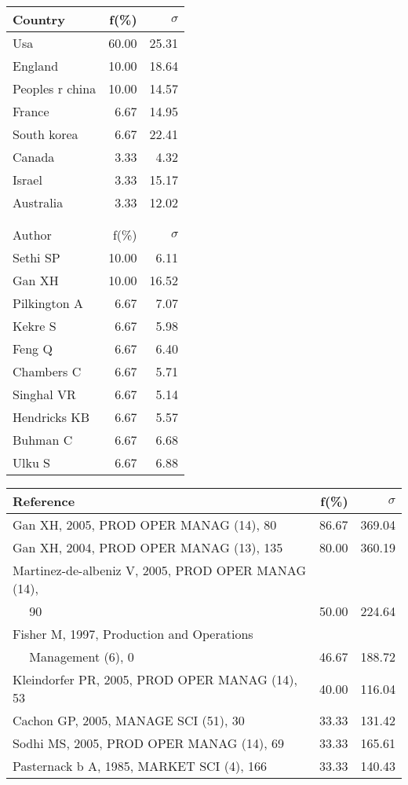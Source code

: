 \documentclass[a4paper,11pt]{report}
\begin{document}
\begin{landscape}
\begin{table}[!ht]
{\begin{tabular}{|l r r|}
\hline
\hline
Country & f(\%) & $\sigma$\\
\hline
Usa & 60.00 & 25.31\\
England & 10.00 & 18.64\\
Peoples r china & 10.00 & 14.57\\
France & 6.67 & 14.95\\
South korea & 6.67 & 22.41\\
Canada & 3.33 & 4.32\\
Israel & 3.33 & 15.17\\
Australia & 3.33 & 12.02\\
 &  & \\
 &  & \\
\hline
\hline
Author & f(\%) & $\sigma$\\
\hline
Sethi SP & 10.00 & 6.11\\
Gan XH & 10.00 & 16.52\\
Pilkington A & 6.67 & 7.07\\
Kekre S & 6.67 & 5.98\\
Feng Q & 6.67 & 6.40\\
Chambers C & 6.67 & 5.71\\
Singhal VR & 6.67 & 5.14\\
Hendricks KB & 6.67 & 5.57\\
Buhman C & 6.67 & 6.68\\
Ulku S & 6.67 & 6.88\\
\hline
\end{tabular}
}
{\scriptsize\begin{tabular}{|l r r|}
\hline
Reference & f(\%) & $\sigma$\\
\hline
Gan XH, 2005, PROD OPER MANAG (14), 80 & 86.67 & 369.04\\
Gan XH, 2004, PROD OPER MANAG (13), 135 & 80.00 & 360.19\\
Martinez-de-albeniz V, 2005, PROD OPER MANAG (14), &  & \\
$\quad$ 90 & 50.00 & 224.64\\
Fisher M, 1997, Production and Operations &  & \\
$\quad$ Management (6), 0 & 46.67 & 188.72\\
Kleindorfer PR, 2005, PROD OPER MANAG (14), 53 & 40.00 & 116.04\\
Cachon GP, 2005, MANAGE SCI (51), 30 & 33.33 & 131.42\\
Sodhi MS, 2005, PROD OPER MANAG (14), 69 & 33.33 & 165.61\\
Pasternack b A, 1985, MARKET SCI (4), 166 & 33.33 & 140.43\\

\end{tabular}}
\end{table}
\end{landscape}
\end{document}
